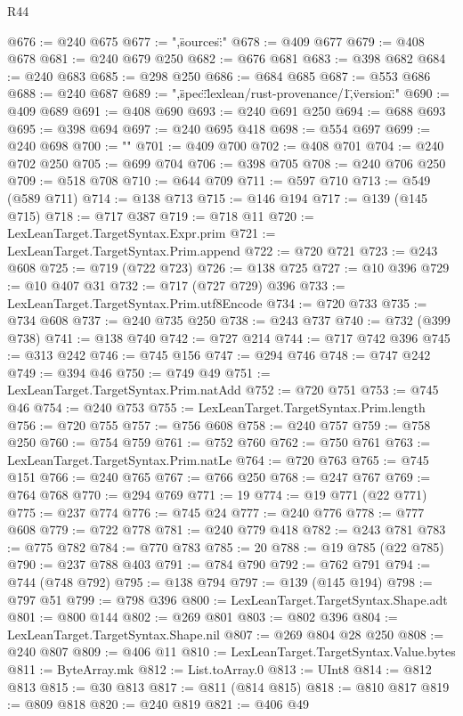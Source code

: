 \begin{lexlean}{R44}
\begin{coremodule}
{@676 := @240 @675
@677 := ",\"sources\":"
@678 := @409 @677
@679 := @408 @678
@681 := @240 @679 @250
@682 := @676 @681
@683 := @398 @682
@684 := @240 @683
@685 := @298 @250
@686 := @684 @685
@687 := @553 @686
@688 := @240 @687
@689 := ",\"spec\":\"lexlean/rust-provenance/1\",\"version\":"
@690 := @409 @689
@691 := @408 @690
@693 := @240 @691 @250
@694 := @688 @693
@695 := @398 @694
@697 := @240 @695 @418
@698 := @554 @697
@699 := @240 @698
@700 := "}\n"
@701 := @409 @700
@702 := @408 @701
@704 := @240 @702 @250
@705 := @699 @704
@706 := @398 @705
@708 := @240 @706 @250
@709 := @518 @708
@710 := @644 @709
@711 := @597 @710
@713 := @549 (@589 @711)
@714 := @138 @713
@715 := @146 @194
@717 := @139 (@145 @715)
@718 := @717 @387
@719 := @718 @11
@720 := LexLeanTarget.TargetSyntax.Expr.prim
@721 := LexLeanTarget.TargetSyntax.Prim.append
@722 := @720 @721
@723 := @243 @608
@725 := @719 (@722 @723)
@726 := @138 @725
@727 := @10 @396
@729 := @10 @407 @31
@732 := @717 (@727 @729) @396
@733 := LexLeanTarget.TargetSyntax.Prim.utf8Encode
@734 := @720 @733
@735 := @734 @608
@737 := @240 @735 @250
@738 := @243 @737
@740 := @732 (@399 @738)
@741 := @138 @740
@742 := @727 @214
@744 := @717 @742 @396
@745 := @313 @242
@746 := @745 @156
@747 := @294 @746
@748 := @747 @242
@749 := @394 @46
@750 := @749 @49
@751 := LexLeanTarget.TargetSyntax.Prim.natAdd
@752 := @720 @751
@753 := @745 @46
@754 := @240 @753
@755 := LexLeanTarget.TargetSyntax.Prim.length
@756 := @720 @755
@757 := @756 @608
@758 := @240 @757
@759 := @758 @250
@760 := @754 @759
@761 := @752 @760
@762 := @750 @761
@763 := LexLeanTarget.TargetSyntax.Prim.natLe
@764 := @720 @763
@765 := @745 @151
@766 := @240 @765
@767 := @766 @250
@768 := @247 @767
@769 := @764 @768
@770 := @294 @769
@771 := 19
@774 := @19 @771 (@22 @771)
@775 := @237 @774
@776 := @745 @24
@777 := @240 @776
@778 := @777 @608
@779 := @722 @778
@781 := @240 @779 @418
@782 := @243 @781
@783 := @775 @782
@784 := @770 @783
@785 := 20
@788 := @19 @785 (@22 @785)
@790 := @237 @788 @403
@791 := @784 @790
@792 := @762 @791
@794 := @744 (@748 @792)
@795 := @138 @794
@797 := @139 (@145 @194)
@798 := @797 @51
@799 := @798 @396
@800 := LexLeanTarget.TargetSyntax.Shape.adt
@801 := @800 @144
@802 := @269 @801
@803 := @802 @396
@804 := LexLeanTarget.TargetSyntax.Shape.nil
@807 := @269 @804 @28 @250
@808 := @240 @807
@809 := @406 @11
@810 := LexLeanTarget.TargetSyntax.Value.bytes
@811 := ByteArray.mk
@812 := List.toArray.{0}
@813 := UInt8
@814 := @812 @813
@815 := @30 @813
@817 := @811 (@814 @815)
@818 := @810 @817
@819 := @809 @818
@820 := @240 @819
@821 := @406 @49

\end{coremodule}
\end{lexlean}

